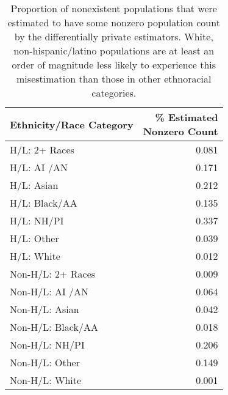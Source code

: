 \begin{table}[ht]
\centering
\begin{tabular}{l|r}
 Ethnicity/Race Category & \thead{\% Estimated \\ Nonzero Count} \\ 
  \hline
  H/L: 2+ Races & 0.081 \\ 
  H/L: AI /AN & 0.171 \\ 
  H/L: Asian & 0.212 \\ 
  H/L: Black/AA & 0.135 \\ 
  H/L: NH/PI & 0.337 \\ 
  H/L: Other & 0.039 \\ 
  H/L: White & 0.012 \\ 
   \hline
  Non-H/L: 2+ Races & 0.009 \\ 
  Non-H/L: AI /AN & 0.064 \\ 
  Non-H/L: Asian & 0.042 \\ 
  Non-H/L: Black/AA & 0.018 \\ 
  Non-H/L: NH/PI & 0.206 \\ 
  Non-H/L: Other & 0.149 \\ 
  Non-H/L: White & 0.001 \\ 
  \end{tabular}
  \caption{Proportion of nonexistent populations that were estimated to have some nonzero population count by the differentially private estimators. White, non-hispanic/latino populations are at least an order of magnitude less likely to experience this misestimation than those in other ethnoracial categories.}
  \label{tab:nonzero-by}
\end{table}

